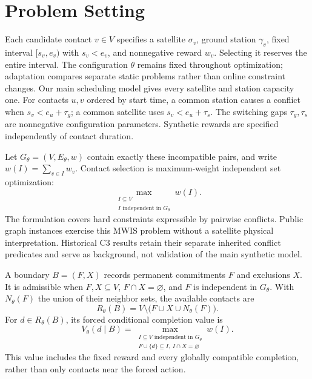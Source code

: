 \section{Problem Setting}
\label{sec:problem}

Each candidate contact $v\in V$ specifies a satellite $\sigma_v$, ground
station $\gamma_v$, fixed interval $[s_v,e_v)$ with $s_v<e_v$, and
nonnegative reward $w_v$. Selecting it reserves the entire interval.
The configuration $\theta$ remains fixed throughout optimization; adaptation
compares separate static problems rather than online constraint changes.
Our main scheduling model gives every satellite and station capacity one.
For contacts $u,v$ ordered by start time, a common station causes a conflict
when $s_v<e_u+\tau_g$; a common satellite uses $s_v<e_u+\tau_s$.
The switching gaps $\tau_g,\tau_s$ are nonnegative configuration parameters.
Synthetic rewards are specified independently of contact duration.

Let $G_\theta=(V,E_\theta,w)$ contain exactly these incompatible pairs, and
write $w(I)=\sum_{v\in I}w_v$. Contact selection is maximum-weight independent
set optimization:
\begin{equation}
 \max_{\substack{I\subseteq V\\I\text{ independent in }G_\theta}}w(I).
 \label{eq:mwis}
\end{equation}
The formulation covers hard constraints expressible by pairwise conflicts.
Public graph instances exercise this MWIS problem without a satellite
physical interpretation. Historical C3 results retain their separate
inherited conflict predicates and serve as background, not validation of
the main synthetic model.

A boundary $B=(F,X)$ records permanent commitments $F$ and exclusions $X$.
It is admissible when $F,X\subseteq V$, $F\cap X=\varnothing$, and $F$ is
independent in $G_\theta$. With $N_\theta(F)$ the union of their neighbor
sets, the available contacts are
\begin{equation}
 R_\theta(B)=V\setminus\bigl(F\cup X\cup N_\theta(F)\bigr).
 \label{eq:residual}
\end{equation}
For $d\in R_\theta(B)$, its forced conditional completion value is
\begin{equation}
 V_\theta(d\mid B)=
 \max_{\substack{I\subseteq V\text{ independent in }G_\theta\\
                 F\cup\{d\}\subseteq I,\ I\cap X=\varnothing}}w(I).
 \label{eq:conditional-value}
\end{equation}
This value includes the fixed reward and every globally compatible
completion, rather than only contacts near the forced action.

